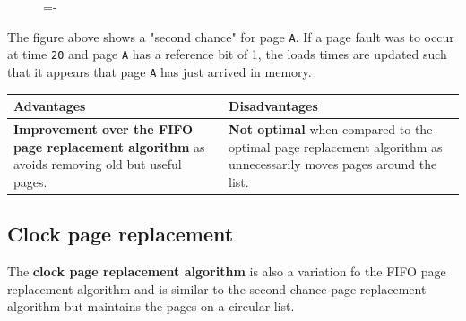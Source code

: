 \documentclass[a4paper]{systems-software}
\begin{document}
\begin{figure}[H]
  \lineskip=-\fboxrule
\end{figure}

The figure above shows a "second chance" for page \texttt{A}. If a page fault was to occur at time \texttt{20} and page \texttt{A} has a reference bit of 1, the loads times are updated such that it appears that page \texttt{A} has just arrived in memory.

\begin{longtabu} to \textwidth {| X[1,l] | X[1,l] |}
    \hline
    \textbf{Advantages} & \textbf{Disadvantages}
	\\ \hline
	\textbf{Improvement over the FIFO page replacement algorithm} as avoids removing old but useful pages. & \textbf{Not optimal} when compared to the optimal page replacement algorithm as unnecessarily moves pages around the list.
	\\ \hline
\end{longtabu}


\subsection*{Clock page replacement}

The \textbf{clock page replacement algorithm} is also a variation fo the FIFO page replacement algorithm and is similar to the second chance page replacement algorithm but maintains the pages on a circular list.
\end{document}
